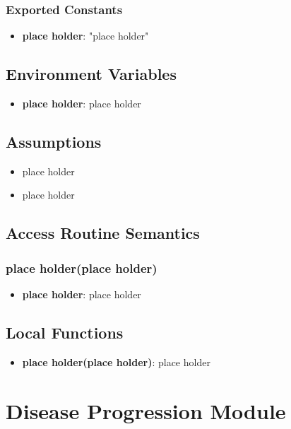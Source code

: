 \documentclass[12pt, titlepage]{article}
\begin{document}
\subsubsection{Exported Constants}
\begin{itemize}
\item \textbf{place holder}: "place holder" 
\end{itemize}

\subsection{Environment Variables}
\begin{itemize}
\item \textbf{place holder}: place holder
\end{itemize}

\subsection{Assumptions}
\begin{itemize}
    \item place holder
    \item place holder
\end{itemize}


\subsection{Access Routine Semantics}
\subsubsection{place holder(place holder)}
\begin{itemize}
    \item \textbf{place holder}: place holder
\end{itemize}

\subsection{Local Functions}
\begin{itemize}
\item \textbf{place holder(place holder)}: place holder
\end{itemize}

\section{Disease Progression Module}
\label{Disease Progression Module}
\end{document}
